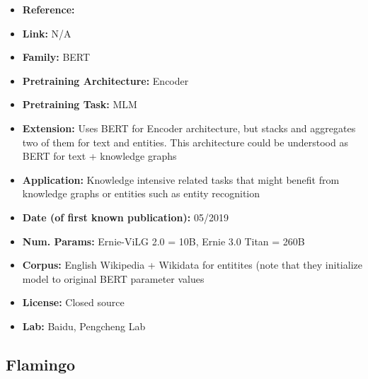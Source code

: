 \documentclass{article}
\begin{document}
            \begin{itemize}
                \item \textbf{Reference:}\href{https://arxiv.org/abs/1905.07129}{}
                \item \textbf{Link:} N/A
                \item \textbf{Family:} BERT 
                \item \textbf{Pretraining Architecture:} Encoder
                \item \textbf{Pretraining Task:} MLM
                \item \textbf{Extension:} Uses BERT for Encoder architecture, but stacks and aggregates two of them for text and entities. This architecture could be understood as BERT for text + knowledge graphs  
                \item \textbf{Application:} Knowledge intensive related tasks that might benefit from knowledge graphs or entities such as entity recognition
                \item \textbf{Date (of first known publication):} 05/2019
                \item \textbf{Num. Params:} Ernie-ViLG 2.0 = 10B, Ernie 3.0 Titan = 260B
                \item \textbf{Corpus:} English Wikipedia + Wikidata for entitites (note that they initialize model to original BERT parameter values
                \item \textbf{License:} Closed source
                \item \textbf{Lab:} Baidu, Pengcheng Lab
            \end{itemize} 
            
\subsection{Flamingo}
\end{document}
